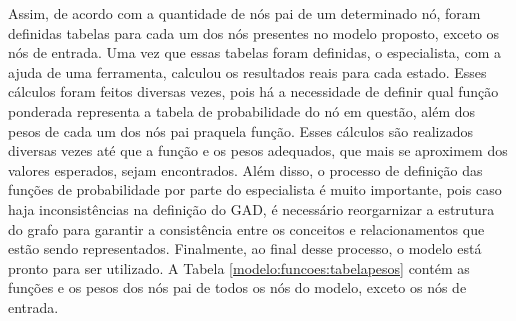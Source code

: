 \begin{table}[ht!]
\centering
\caption{Tabela para definição das Funções de Probabilidade de nós com três pais.}
\label{modelo:funcoes:tabela3nos}
\end{table}

Assim, de acordo com a quantidade de nós pai de um determinado nó, foram definidas tabelas para cada um dos nós presentes no modelo proposto, exceto os nós de entrada. Uma vez que essas tabelas foram definidas, o especialista, com a ajuda de uma ferramenta, calculou os resultados reais para cada estado. Esses cálculos foram feitos diversas vezes, pois há a necessidade de definir qual função ponderada representa a tabela de probabilidade do nó em questão, além dos pesos de cada um dos nós pai praquela função. Esses cálculos são realizados diversas vezes até que a função e os pesos adequados, que mais se aproximem dos valores esperados, sejam encontrados. Além disso, o processo de definição das funções de probabilidade por parte do especialista é muito importante, pois caso haja inconsistências na definição do GAD, é necessário reorgarnizar a estrutura do grafo para garantir a consistência entre os conceitos e relacionamentos que estão sendo representados. Finalmente, ao final desse processo, o modelo está pronto para ser utilizado. A Tabela \ref{modelo:funcoes:tabelapesos} contém as funções e os pesos dos nós pai de todos os nós do modelo, exceto os nós de entrada.

